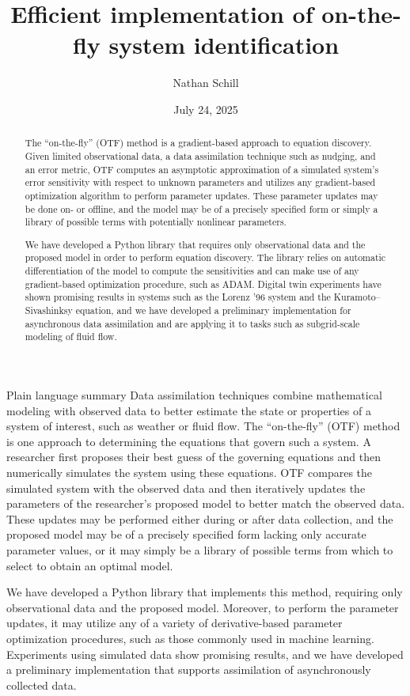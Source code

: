 \documentclass[12pt]{article}
\title{Efficient implementation of on-the-fly system identification}
\author{Nathan Schill}
\date{July 24, 2025}
\begin{document}
\maketitle

\begin{abstract}
  The ``on-the-fly'' (OTF) method is a gradient-based approach to equation discovery.
  Given limited observational data, a data assimilation technique such as nudging, and an error metric, OTF computes an asymptotic approximation of a simulated system's error sensitivity with respect to unknown parameters and utilizes any gradient-based optimization algorithm to perform parameter updates.
  These parameter updates may be done on- or offline, and the model may be of a precisely specified form or simply a library of possible terms with potentially nonlinear parameters.

  We have developed a Python library that requires only observational data and the proposed model in order to perform equation discovery.
  The library relies on automatic differentiation of the model to compute the sensitivities and can make use of any gradient-based optimization procedure, such as ADAM.
  Digital twin experiments have shown promising results in systems such as the Lorenz '96 system and the Kuramoto--Sivashinksy equation, and we have developed a preliminary implementation for asynchronous data assimilation and are applying it to tasks such as subgrid-scale modeling of fluid flow.
\end{abstract}

\begin{section}{Plain language summary}
  Data assimilation techniques combine mathematical modeling with observed data to better estimate the state or properties of a system of interest, such as weather or fluid flow.
  The ``on-the-fly'' (OTF) method is one approach to determining the equations that govern such a system.
  A researcher first proposes their best guess of the governing equations and then numerically simulates the system using these equations.
  OTF compares the simulated system with the observed data and then iteratively updates the parameters of the researcher's proposed model to better match the observed data.
  These updates may be performed either during or after data collection, and the proposed model may be of a precisely specified form lacking only accurate parameter values, or it may simply be a library of possible terms from which to select to obtain an optimal model.

  We have developed a Python library that implements this method, requiring only observational data and the proposed model.
  Moreover, to perform the parameter updates, it may utilize any of a variety of derivative-based parameter optimization procedures, such as those commonly used in machine learning.
  Experiments using simulated data show promising results, and we have developed a preliminary implementation that supports assimilation of asynchronously collected data.
\end{section}
\end{document}
